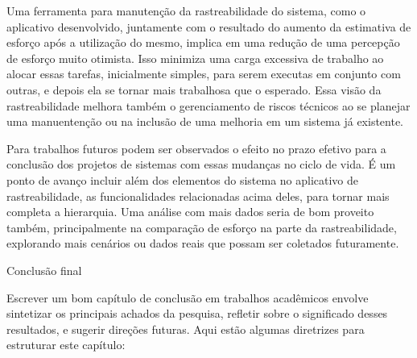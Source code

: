 	Uma ferramenta para manutenção da rastreabilidade do sistema, como o aplicativo desenvolvido, juntamente com o resultado do aumento da estimativa de esforço após a utilização do mesmo, implica em uma redução de uma percepção de esforço muito otimista.
	Isso minimiza uma carga excessiva de trabalho ao alocar essas tarefas, inicialmente simples, para serem executas em conjunto com outras, e depois ela se tornar mais trabalhosa que o esperado.
	Essa visão da rastreabilidade melhora também o gerenciamento de riscos técnicos ao se planejar uma manuentenção ou na inclusão de uma melhoria em um sistema já existente.

	Para trabalhos futuros podem ser observados o efeito no prazo efetivo para a conclusão dos projetos de sistemas com essas mudanças no ciclo de vida. É um ponto de avanço incluir além dos elementos do sistema no aplicativo de rastreabilidade, as funcionalidades relacionadas acima deles, para tornar mais completa a hierarquia.
	Uma análise com mais dados seria de bom proveito também, principalmente na comparação de esforço na parte da rastreabilidade, explorando mais cenários ou dados reais que possam ser coletados futuramente.

	{\color{red}Conclusão final}







	Escrever um bom capítulo de conclusão em trabalhos acadêmicos envolve sintetizar os principais achados da pesquisa, refletir sobre o significado desses resultados, e sugerir direções futuras. Aqui estão algumas diretrizes para estruturar este capítulo:

